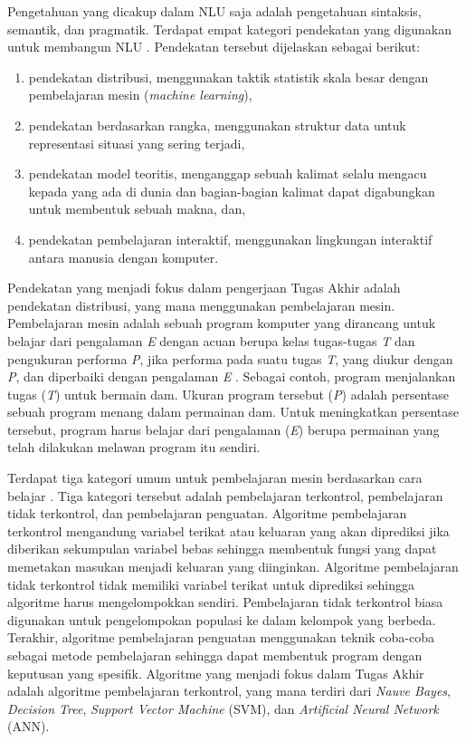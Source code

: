 Pengetahuan yang dicakup dalam NLU saja adalah pengetahuan sintaksis, semantik, dan pragmatik. Terdapat empat kategori pendekatan yang digunakan untuk membangun NLU \parencite{yao2017four}. Pendekatan tersebut dijelaskan sebagai berikut:

\begin{enumerate}
	\item pendekatan distribusi, menggunakan taktik statistik skala besar dengan pembelajaran mesin (\textit{machine learning}),
	\item pendekatan berdasarkan rangka, menggunakan struktur data untuk representasi situasi yang sering terjadi,
	\item pendekatan model teoritis, menganggap sebuah kalimat selalu mengacu kepada yang ada di dunia dan bagian-bagian kalimat dapat digabungkan untuk membentuk sebuah makna, dan,
	\item pendekatan pembelajaran interaktif, menggunakan lingkungan interaktif antara manusia dengan komputer.
\end{enumerate}

Pendekatan yang menjadi fokus dalam pengerjaan Tugas Akhir adalah pendekatan distribusi, yang mana menggunakan pembelajaran mesin. Pembelajaran mesin adalah sebuah program komputer yang dirancang untuk belajar dari pengalaman \textit{E} dengan acuan berupa kelas tugas-tugas \textit{T} dan pengukuran performa \textit{P}, jika performa pada suatu tugas \textit{T}, yang diukur dengan \textit{P}, dan diperbaiki dengan pengalaman \textit{E} \parencite{mitchell1997machine}. Sebagai contoh, program menjalankan tugas (\textit{T}) untuk bermain dam. Ukuran program tersebut (\textit{P}) adalah persentase sebuah program menang dalam permainan dam. Untuk meningkatkan persentase tersebut, program harus belajar dari pengalaman (\textit{E}) berupa permainan yang telah dilakukan melawan program itu sendiri.

Terdapat tiga kategori umum untuk pembelajaran mesin berdasarkan cara belajar \parencite{ray2015essentials}. Tiga kategori tersebut adalah pembelajaran terkontrol, pembelajaran tidak terkontrol, dan pembelajaran penguatan. Algoritme pembelajaran terkontrol mengandung variabel terikat atau keluaran yang akan diprediksi jika diberikan sekumpulan variabel bebas sehingga membentuk fungsi yang dapat memetakan masukan menjadi keluaran yang diinginkan. Algoritme pembelajaran tidak terkontrol tidak memiliki variabel terikat untuk diprediksi sehingga algoritme harus mengelompokkan sendiri. Pembelajaran tidak terkontrol biasa digunakan untuk pengelompokan populasi ke dalam kelompok yang berbeda. Terakhir, algoritme pembelajaran penguatan menggunakan teknik coba-coba sebagai metode pembelajaran sehingga dapat membentuk program dengan keputusan yang spesifik. Algoritme yang menjadi fokus dalam Tugas Akhir adalah algoritme pembelajaran terkontrol, yang mana terdiri dari \textit{Nauve Bayes}, \textit{Decision Tree}, \textit{Support Vector Machine} (SVM), dan \textit{Artificial Neural Network} (ANN).

